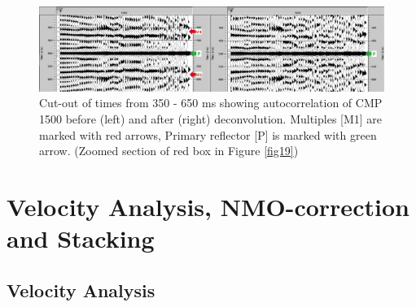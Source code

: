 \documentclass[10pt,a4paper]{article}
\begin{document}
\begin{figure}[H]
\includegraphics[width=\textwidth]{fig20.jpg}
\caption{Cut-out of times from 350 - 650 ms showing autocorrelation of CMP 1500 before (left) and after (right) deconvolution. Multiples [M1] are marked with red arrows, Primary reflector [P] is marked with green arrow. (Zoomed section of red box in Figure \ref{fig19})}
\label{fig20}
\end{figure}


\section{Velocity Analysis, NMO-correction and Stacking}

\subsection{Velocity Analysis}
\end{document}
